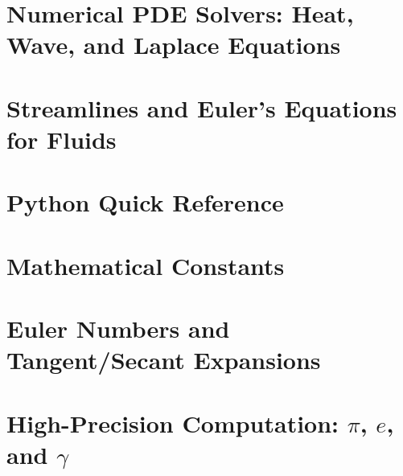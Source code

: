 \documentclass[11pt,a4paper,twoside]{book}
\theoremstyle{eulerstyle}
\theoremstyle{definition}
\begin{document}
\cleardoublepage

\chapter{Numerical PDE Solvers: Heat, Wave, and Laplace Equations}
\label{ch:pdes}


\cleardoublepage

\chapter{Streamlines and Euler's Equations for Fluids}
\label{ch:streamlines}


\cleardoublepage

\backmatter

\appendix
\chapter{Python Quick Reference}
\label{app:python}
%

\cleardoublepage

\chapter{Mathematical Constants}
\label{app:constants}


\cleardoublepage

\chapter{Euler Numbers and Tangent/Secant Expansions}
\label{ch:euler_numbers}


\cleardoublepage

\chapter{High-Precision Computation: $\pi$, $e$, and $\gamma$}
\label{ch:high_precision}

\end{document}
